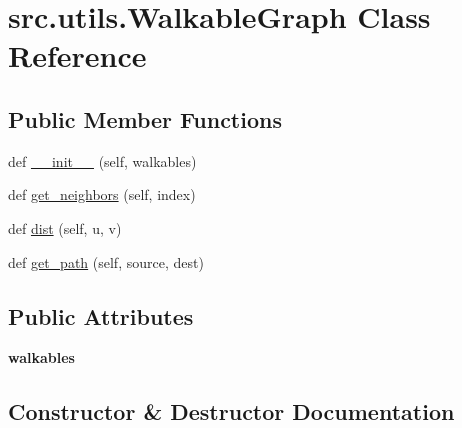 \hypertarget{classsrc_1_1utils_1_1_walkable_graph}{}\section{src.\+utils.\+Walkable\+Graph Class Reference}
\label{classsrc_1_1utils_1_1_walkable_graph}
\subsection*{Public Member Functions}
\begin{DoxyCompactItemize}
\item 
def \hyperlink{classsrc_1_1utils_1_1_walkable_graph_a087591970d0d87689913f3235c13ddb1}{\+\_\+\+\_\+init\+\_\+\+\_\+} (self, walkables)
\item 
def \hyperlink{classsrc_1_1utils_1_1_walkable_graph_a1654a649f182a6839bae35b08a44a18c}{get\+\_\+neighbors} (self, index)
\item 
def \hyperlink{classsrc_1_1utils_1_1_walkable_graph_a03177c28b206b2d99a67cbe76f1c1f6b}{dist} (self, u, v)
\item 
def \hyperlink{classsrc_1_1utils_1_1_walkable_graph_afd2df4fd215571707ca30ce6776fe1ce}{get\+\_\+path} (self, source, dest)
\end{DoxyCompactItemize}
\subsection*{Public Attributes}
\begin{DoxyCompactItemize}
\item 
\hypertarget{classsrc_1_1utils_1_1_walkable_graph_a9fbab0afaa540fdd79c43a2ce7da2527}{}\label{classsrc_1_1utils_1_1_walkable_graph_a9fbab0afaa540fdd79c43a2ce7da2527} 
{\bfseries walkables}
\end{DoxyCompactItemize}


\subsection{Constructor \& Destructor Documentation}
\hypertarget{classsrc_1_1utils_1_1_walkable_graph_a087591970d0d87689913f3235c13ddb1}{}\label{classsrc_1_1utils_1_1_walkable_graph_a087591970d0d87689913f3235c13ddb1} 

